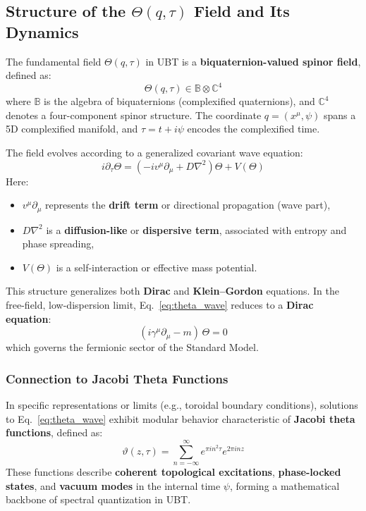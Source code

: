 \documentclass[12pt, a4paper]{article}
\begin{document}
\subsection*{Structure of the \( \Theta(q, \tau) \) Field and Its Dynamics}
The fundamental field \( \Theta(q, \tau) \) in UBT is a \textbf{biquaternion-valued spinor field}, defined as:
\[
\Theta(q, \tau) \in \mathbb{B} \otimes \mathbb{C}^4
\]
where \( \mathbb{B} \) is the algebra of biquaternions (complexified quaternions), and \( \mathbb{C}^4 \) denotes a four-component spinor structure. The coordinate \( q = (x^\mu, \psi) \) spans a 5D complexified manifold, and \( \tau = t + i\psi \) encodes the complexified time.

The field evolves according to a generalized covariant wave equation:
\begin{equation}
i \partial_\tau \Theta = \left( -i v^\mu \partial_\mu + D \nabla^2 \right) \Theta + V(\Theta)
\label{eq:theta_wave}
\end{equation}
Here:
\begin{itemize}
  \item \( v^\mu \partial_\mu \) represents the \textbf{drift term} or directional propagation (wave part),
  \item \( D \nabla^2 \) is a \textbf{diffusion-like} or \textbf{dispersive term}, associated with entropy and phase spreading,
  \item \( V(\Theta) \) is a self-interaction or effective mass potential.
\end{itemize}

This structure generalizes both \textbf{Dirac} and \textbf{Klein--Gordon} equations. In the free-field, low-dispersion limit, Eq.~\eqref{eq:theta_wave} reduces to a \textbf{Dirac equation}:
\begin{equation}
(i \gamma^\mu \partial_\mu - m)\, \Theta = 0
\label{eq:dirac}
\end{equation}
which governs the fermionic sector of the Standard Model.

\subsubsection*{Connection to Jacobi Theta Functions}
In specific representations or limits (e.g., toroidal boundary conditions), solutions to Eq.~\eqref{eq:theta_wave} exhibit modular behavior characteristic of \textbf{Jacobi theta functions}, defined as:
\[
\vartheta(z, \tau) = \sum_{n=-\infty}^\infty e^{\pi i n^2 \tau} e^{2\pi i n z}
\]
These functions describe \textbf{coherent topological excitations}, \textbf{phase-locked states}, and \textbf{vacuum modes} in the internal time \( \psi \), forming a mathematical backbone of spectral quantization in UBT.
\end{document}
